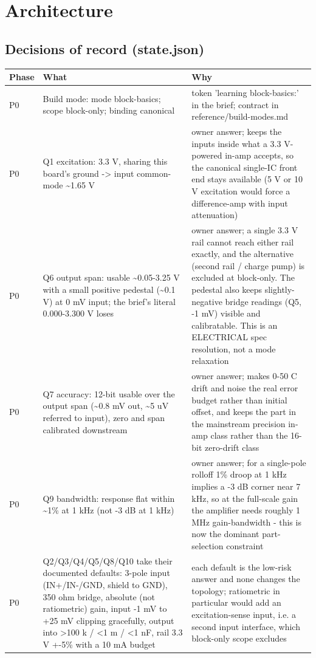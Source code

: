 \documentclass[11pt,a4paper]{article}
\begin{document}
\section{Architecture}
\subsection*{Decisions of record (state.json)}
{\small
\begin{longtable}{lp{5.2cm}p{7.2cm}}
\toprule
\textbf{Phase} & \textbf{What} & \textbf{Why} \\
\midrule
\endhead
P0 & Build mode: mode block-basics; scope block-only; binding canonical & token 'learning block-basics:' in the brief; contract in reference/build-modes.md \\
P0 & Q1 excitation: 3.3 V, sharing this board's ground -\textgreater{} input common-mode \textasciitilde{}1.65 V & owner answer; keeps the inputs inside what a 3.3 V-powered in-amp accepts, so the canonical single-IC front end stays available (5 V or 10 V excitation would force a difference-amp with input attenuation) \\
P0 & Q6 output span: usable \textasciitilde{}0.05-3.25 V with a small positive pedestal (\textasciitilde{}0.1 V) at 0 mV input; the brief's literal 0.000-3.300 V loses & owner answer; a single 3.3 V rail cannot reach either rail exactly, and the alternative (second rail / charge pump) is excluded at block-only. The pedestal also keeps slightly-negative bridge readings (Q5, -1 mV) visible and calibratable. This is an ELECTRICAL spec resolution, not a mode relaxation \\
P0 & Q7 accuracy: 12-bit usable over the output span (\textasciitilde{}0.8 mV out, \textasciitilde{}5 uV referred to input), zero and span calibrated downstream & owner answer; makes 0-50 C drift and noise the real error budget rather than initial offset, and keeps the part in the mainstream precision in-amp class rather than the 16-bit zero-drift class \\
P0 & Q9 bandwidth: response flat within \textasciitilde{}1\% at 1 kHz (not -3 dB at 1 kHz) & owner answer; for a single-pole rolloff 1\% droop at 1 kHz implies a -3 dB corner near 7 kHz, so at the full-scale gain the amplifier needs roughly 1 MHz gain-bandwidth - this is now the dominant part-selection constraint \\
P0 & Q2/Q3/Q4/Q5/Q8/Q10 take their documented defaults: 3-pole input (IN+/IN-/GND, shield to GND), 350 ohm bridge, absolute (not ratiometric) gain, input -1 mV to +25 mV clipping gracefully, output into \textgreater{}100 k / \textless{}1 m / \textless{}1 nF, rail 3.3 V +-5\% with a 10 mA budget & each default is the low-risk answer and none changes the topology; ratiometric in particular would add an excitation-sense input, i.e. a second input interface, which block-only scope excludes \\

\end{longtable}}
\end{document}
